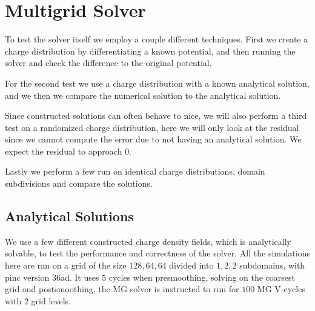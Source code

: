 \section{Multigrid Solver}
	To test the solver itself we employ a couple different techniques. First we
	create a charge distribution by differentiating a known potential, and then
	running the solver and check the difference to the original potential.

	For the second test we use a charge distribution with a known analytical solution,
	and we then we compare the numerical solution to the analytical solution.

	Since constructed solutions can often behave to nice, we will also perform
	a third test on a randomized charge distribution, here we will only look at the
	residual since we cannot compute the error due to not having an analytical solution.
	We expect the residual to approach \(0\).

	Lastly we perform a few run on identical charge distributions, domain subdivisions
	and compare the solutions.

%




\subsection{Analytical Solutions}
	We use a few different constructed charge density fields, which is analytically solvable,
	to test the performance and correctness of the solver. All the simulations here are ran on
	a grid of the size \( 128, 64, 64 \) divided into \(1,2,2\) subdomains, with pinc
	version 36ad.
		It uses \(5\) cycles when presmoothing, solving on the coarsest grid and postsmoothing, the
	MG solver is instructed to run for \(100\) MG V-cycles with \(2\) grid levels.

